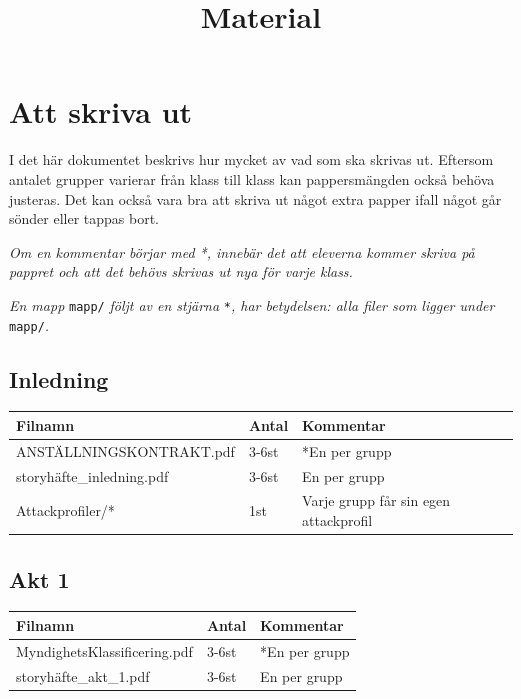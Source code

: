\documentclass[a4paper,12pt]{article}
\title{Material}
\date{}
\begin{document}
\maketitle
\section*{Att skriva ut}

I det här dokumentet beskrivs hur mycket av vad som ska skrivas ut. Eftersom antalet grupper varierar från klass till klass kan pappersmängden också behöva justeras. Det kan också vara bra att skriva ut något extra papper ifall något går sönder eller tappas bort.

\textit{Om en kommentar börjar med *, innebär det att eleverna kommer skriva på pappret och att det behövs skrivas ut nya för varje klass.}

\textit{En mapp} \texttt{mapp/} \textit{följt av en stjärna} \texttt{*}\textit{, har betydelsen: alla filer som ligger under} \texttt{mapp/}\textit{.}

\subsection*{Inledning}

\begin{tabular}{|l|l|p{6cm}|}
\hline
\textbf{Filnamn} & \textbf{Antal} & \textbf{Kommentar} \\
\hline
ANSTÄLLNINGSKONTRAKT.pdf  & 3-6st & *En per grupp \\
\hline
storyhäfte\_inledning.pdf & 3-6st & En per grupp \\
\hline
Attackprofiler/*          & 1st   & Varje grupp får sin egen attackprofil \\
\hline
\end{tabular}

\subsection*{Akt 1}

\begin{tabular}{|l|l|p{6cm}|}
\hline
\textbf{Filnamn} & \textbf{Antal} & \textbf{Kommentar} \\
\hline
MyndighetsKlassificering.pdf & 3-6st & *En per grupp \\
\hline
storyhäfte\_akt\_1.pdf       & 3-6st & En per grupp \\
\hline
\end{tabular}
\end{document}
